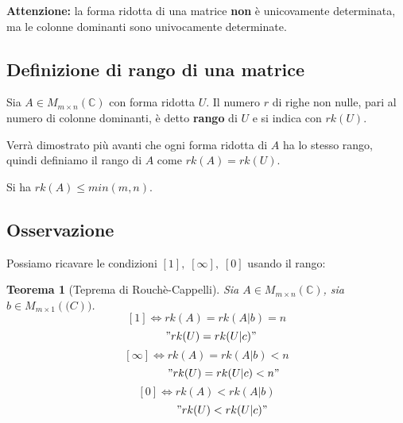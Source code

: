 \documentclass[a4paper]{article}
\newtheorem{theorem}{Teorema}
\theoremstyle{break}
\theoremstyle{break}
\theoremstyle{break}
\theoremstyle{break}
\begin{document}
\noindent \textbf{Attenzione:} la forma ridotta di una matrice \textbf{non} è unicovamente
determinata, ma le colonne dominanti sono univocamente determinate.

\subsection{Definizione di rango di una matrice}
\begin{definition}
  Sia \( A \in M_{m \times n}(\mathbb{C}) \) con forma ridotta \( U \). Il numero \( r \) di righe non
  nulle, pari al numero di colonne dominanti, è detto \textbf{rango} di \( U \) e si indica
  con \( rk(U) \).
\end{definition}
Verrà dimostrato più avanti che ogni forma ridotta di \( A \) ha lo stesso rango, quindi
definiamo il rango di \( A \) come \( rk(A) = rk(U) \).

\noindent Si ha \( rk(A) \le min(m,n) \).

\subsection{Osservazione}
Possiamo ricavare le condizioni \( [1],\;[\infty],\;[0] \) usando il rango:

\begin{theorem}[Teprema di Rouchè-Cappelli]
  Sia \( A \in M_{m \times n}(\mathbb{C}) \), sia \( b \in M_{m \times 1}(\mathbb(C)) \).
  \[
    [1] \Leftrightarrow rk(A) = rk(A|b) = n
  \] 
  \[
    \hspace{0.3cm} "rk(U) = rk(U|c)"
  \] 
  \vspace{0.05cm}
  \[
    [\infty] \Leftrightarrow rk(A) = rk(A|b) < n
  \]
  \[
    \hspace{1.1cm} "rk(U) = rk(U|c) < n"
  \]
  \vspace{0.05cm}
  \[
    [0] \Leftrightarrow rk(A) < rk(A|b)
  \]
  \[
    \hspace{1cm} "rk(U) < rk(U|c)"
  \]
\end{theorem}
\end{document}
